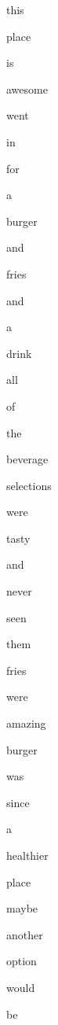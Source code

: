 \documentclass[varwidth]{standalone}
\begin{document}
 \begin{CJK*}{UTF8}{gbsn} 
{\setlength{\fboxsep}{0pt}\colorbox{white!0}{\parbox{0.9\textwidth}{
\colorbox{red!9.43879222869873}{\strut this} 
\colorbox{red!15.81724739074707}{\strut place} 
\colorbox{red!16.98370933532715}{\strut is} 
\colorbox{red!0.0}{\strut awesome} 
\colorbox{red!45.90060806274414}{\strut went} 
\colorbox{red!84.63189697265625}{\strut in} 
\colorbox{red!32.925750732421875}{\strut for} 
\colorbox{red!20.948684692382812}{\strut a} 
\colorbox{red!18.371374130249023}{\strut burger} 
\colorbox{red!59.054840087890625}{\strut and} 
\colorbox{red!24.73834991455078}{\strut fries} 
\colorbox{red!55.49140548706055}{\strut and} 
\colorbox{red!15.397928237915039}{\strut a} 
\colorbox{red!30.738433837890625}{\strut drink} 
\colorbox{red!53.31660461425781}{\strut all} 
\colorbox{red!31.51175308227539}{\strut of} 
\colorbox{red!14.187966346740723}{\strut the} 
\colorbox{red!47.64133071899414}{\strut beverage} 
\colorbox{red!12.736761093139648}{\strut selections} 
\colorbox{red!61.988746643066406}{\strut were} 
\colorbox{red!67.80368041992188}{\strut tasty} 
\colorbox{red!55.30115509033203}{\strut and} 
\colorbox{red!58.74091339111328}{\strut never} 
\colorbox{red!35.20182418823242}{\strut seen} 
\colorbox{red!29.902538299560547}{\strut them} 
\colorbox{red!4.085025787353516}{\strut fries} 
\colorbox{red!17.515504837036133}{\strut were} 
\colorbox{red!37.31486129760742}{\strut amazing} 
\colorbox{red!30.91791343688965}{\strut burger} 
\colorbox{red!100.0}{\strut was} 
\colorbox{red!68.04159545898438}{\strut since} 
\colorbox{red!13.442566871643066}{\strut a} 
\colorbox{red!3.563380241394043}{\strut healthier} 
\colorbox{red!33.67776107788086}{\strut place} 
\colorbox{red!21.673507690429688}{\strut maybe} 
\colorbox{red!41.118873596191406}{\strut another} 
\colorbox{red!39.927677154541016}{\strut option} 
\colorbox{red!31.287979125976562}{\strut would} 
\colorbox{red!27.425613403320312}{\strut be} 

}}}\end{CJK*}
\end{document}
